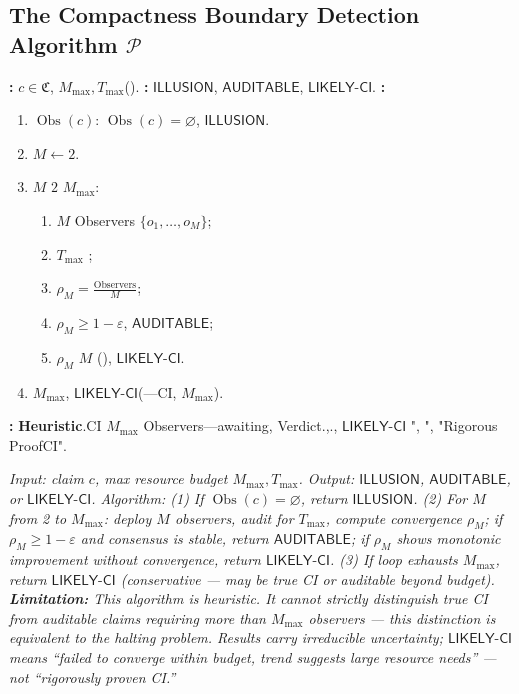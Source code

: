 \documentclass[12pt,a4paper]{article}
\theoremstyle{plain}
\theoremstyle{definition}
\theoremstyle{remark}
\newcommand{\ClaimSpace}{\mathfrak{C}}
\newcommand{\Null}{\varnothing}
\DeclareMathOperator{\ObsSet}{Obs}
\begin{document}
\subsection{The Compactness Boundary Detection Algorithm $\mathcal{P}$}
\begin{protocol}[HeuristicCompactness]\label{prot:P}
\textbf{: } $c \in \ClaimSpace$, $M_{\max}, T_{\max}$().
\textbf{: } $\mathsf{ILLUSION}$, $\mathsf{AUDITABLE}$, $\mathsf{LIKELY\text{-}CI}$.
\textbf{: }
\begin{enumerate}[label= \arabic*:]
 \item $\ObsSet(c)$: $\ObsSet(c) = \Null$, $\mathsf{ILLUSION}$.
 \item $M \leftarrow 2$.
 \item  $M$ $2$ $M_{\max}$: 
 \begin{enumerate}
 \item $M$ Observers $\{o_1, \dots, o_M\}$; 
 \item $T_{\max}$ ; 
 \item $\rho_M = \frac{\text{Observers}}{M}$; 
 \item $\rho_M \geq 1 - \varepsilon$, $\mathsf{AUDITABLE}$; 
 \item $\rho_M$ $M$ \textit{}(), $\mathsf{LIKELY\text{-}CI}$.
 \end{enumerate}
 \item $M_{\max}$, $\mathsf{LIKELY\text{-}CI}$(---CI, $M_{\max}$).
\end{enumerate}
\textbf{: } \textbf{Heuristic}.CI $M_{\max}$ Observers---awaiting, Verdict.,., $\mathsf{LIKELY\text{-}CI}$ ", ", "Rigorous ProofCI".
\end{protocol}
\vspace{4pt}
\noindent
\textit{Input: claim $c$, max resource budget $M_{\max}, T_{\max}$. Output: $\mathsf{ILLUSION}$, $\mathsf{AUDITABLE}$, or $\mathsf{LIKELY\text{-}CI}$. Algorithm: (1) If $\ObsSet(c) = \Null$, return $\mathsf{ILLUSION}$. (2) For $M$ from 2 to $M_{\max}$: deploy $M$ observers, audit for $T_{\max}$, compute convergence $\rho_M$; if $\rho_M \geq 1-\varepsilon$ and consensus is stable, return $\mathsf{AUDITABLE}$; if $\rho_M$ shows monotonic improvement without convergence, return $\mathsf{LIKELY\text{-}CI}$. (3) If loop exhausts $M_{\max}$, return $\mathsf{LIKELY\text{-}CI}$ (conservative --- may be true CI or auditable beyond budget). \textbf{Limitation:} This algorithm is heuristic. It cannot strictly distinguish true CI from auditable claims requiring more than $M_{\max}$ observers --- this distinction is equivalent to the halting problem. Results carry irreducible uncertainty; $\mathsf{LIKELY\text{-}CI}$ means ``failed to converge within budget, trend suggests large resource needs'' --- not ``rigorously proven CI.''}
\newpage
\end{document}
